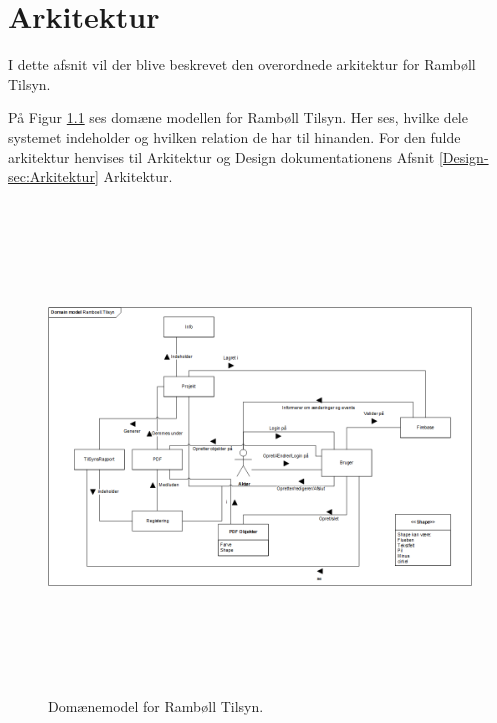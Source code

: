 \chapter{Arkitektur}
I dette afsnit vil der blive beskrevet den overordnede arkitektur for Rambøll Tilsyn.

På Figur \ref{fig:Domain} ses domæne modellen for Rambøll Tilsyn. Her ses, hvilke dele systemet indeholder og hvilken relation de har til hinanden.
For den fulde arkitektur henvises til Arkitektur og Design dokumentationens Afsnit \ref{Design-sec:Arkitektur} Arkitektur.

\begin{figure}[H] %
	\centering
	\includegraphics[height=13cm, width=17cm]{Arkitektur/Domainmodel}
	\caption{Domænemodel for Rambøll Tilsyn.}
	\label{fig:Domain}
\end{figure}

\clearpage

